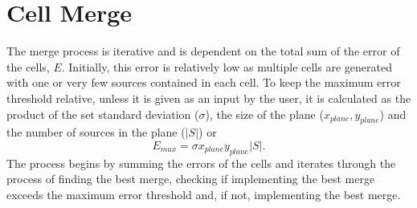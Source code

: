\section{Cell Merge}\label{des:sec:merge}
The merge process is iterative and is dependent on the total sum of the error of the cells, $E$. Initially, this error is relatively low as multiple cells are generated with one or very few sources contained in each cell. To keep the maximum error threshold relative, unless it is given as an input by the user, it is calculated as the product of the set standard deviation ($\sigma$), the size of the plane ($x_{plane},y_{plane}$) and the number of sources in the plane ($|S|$) or 
\begin{equation}\label{des:eq:maxerr}
 E_{max} = \sigma x_{plane}y_{plane}|S|.
\end{equation}
The process begins by summing the errors of the cells and iterates through the process of finding the best merge, checking if implementing the best merge exceeds the maximum error threshold and, if not, implementing the best merge.

